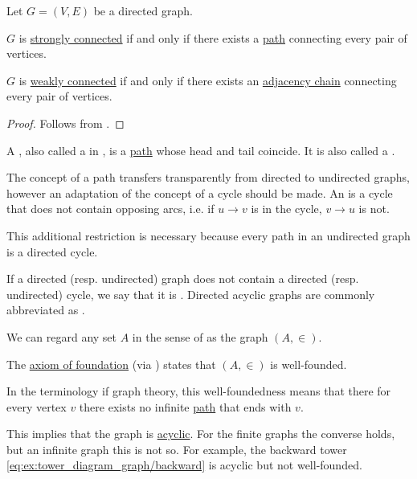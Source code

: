 \begin{proposition}\label{thm:graph_connectedness_via_chains}
  Let \( G = (V, E) \) be a directed graph.

  \begin{thmenum}
     \( G \) is \hyperref[def:graph_connectedness/strong]{strongly connected} if and only if there exists a \hyperref[def:graph_directed_path]{path} connecting every pair of vertices.

     \( G \) is \hyperref[def:graph_connectedness/weak]{weakly connected} if and only if there exists an \hyperref[def:graph_adjacency_chain]{adjacency chain} connecting every pair of vertices.
  \end{thmenum}
\end{proposition}
\begin{proof}
  Follows from .
\end{proof}

\begin{definition}\label{def:graph_cycle}
  A , also called a  in \cite[ch. 1, sec. 1.4]{GondranMinoux1984Graphs}, is a \hyperref[def:graph_directed_path]{path} whose head and tail coincide. It is also called a .

  The concept of a path transfers transparently from directed to undirected graphs, however an adaptation of the concept of a cycle should be made. An  is a cycle that does not contain opposing arcs, i.e. if \( u \to v \) is in the cycle, \( v \to u \) is not.

  This additional restriction is necessary because every path in an undirected graph is a directed cycle.

  If a directed (resp. undirected) graph does not contain a directed (resp. undirected) cycle, we say that it is . Directed acyclic graphs are commonly abbreviated as .
\end{definition}

\begin{remark}\label{rem:well_founded_graphs}
  We can regard any set \( A \) in the sense of \hyperref[def:zfc]{} as the graph \( (A, \in) \).

  The \hyperref[def:zfc/foundation]{axiom of foundation} (via ) states that \( (A, \in) \) is well-founded.

  In the terminology if graph theory, this well-foundedness means that there for every vertex \( v \) there exists no infinite \hyperref[def:graph_directed_path]{path} that ends with \( v \).

  This implies that the graph is \hyperref[def:graph_cycle]{acyclic}. For the finite graphs the converse holds, but an infinite graph this is not so. For example, the backward tower \eqref{eq:ex:tower_diagram_graph/backward} is acyclic but not well-founded.
\end{remark}
